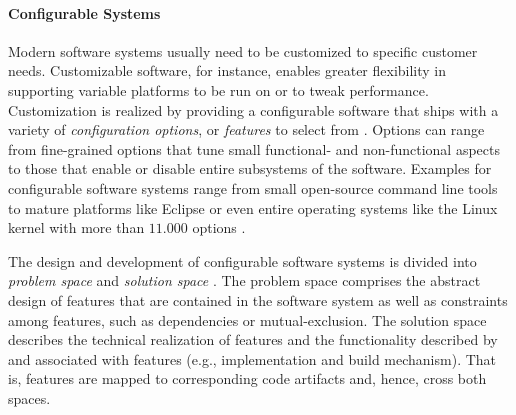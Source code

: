 \paragraph*{Configurable Systems} Modern software systems usually need to be
customized to specific customer needs. Customizable software, for instance, enables greater
flexibility in supporting variable platforms to be run on or to tweak
performance. Customization is realized by providing a configurable software
that ships with a variety of \emph{configuration options}, or \emph{features} to
select from \citep{apel_feature-oriented_2013}.
Options  can range from fine-grained options that tune small functional- and
non-functional aspects to those that enable or disable entire subsystems of the
software. Examples for configurable software systems range from small
open-source command line tools to mature platforms like Eclipse or even entire
operating systems like the Linux kernel with more than $11.000$ options
\citep{dietrich_robust_2012}.

The design and development of configurable software systems is divided into
\emph{problem space} and \emph{solution space} \citep{czarnecki_generative_2000}. The problem space
comprises the abstract design of features that are contained in the software system as well as
constraints among features, such as dependencies or mutual-exclusion. The
solution space describes the technical realization of features and the
functionality described by and associated with features (e.g., implementation
and build mechanism). That is, features are mapped to corresponding code
artifacts and, hence, cross both spaces.


